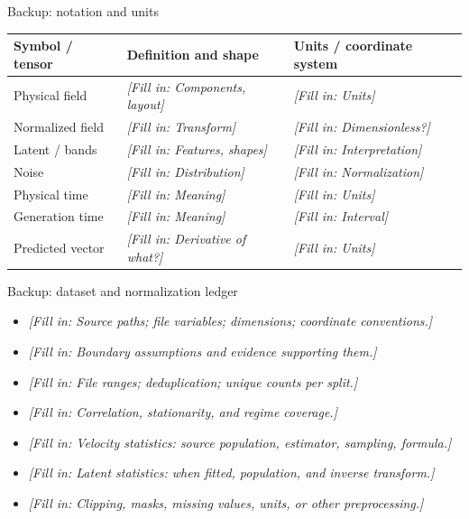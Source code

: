 \documentclass[aspectratio=169,11pt]{beamer}
\newcommand{\fillin}[1]{{\color{prompt}\textit{[Fill in: #1]}}}
\begin{document}
\appendix

\begin{frame}{Backup: notation and units}
  \small
  \begin{tabularx}{\linewidth}{lXX}
    \toprule
    Symbol / tensor & Definition and shape & Units / coordinate system \\
    \midrule
    Physical field & \fillin{Components, layout} & \fillin{Units} \\
    Normalized field & \fillin{Transform} & \fillin{Dimensionless?} \\
    Latent / bands & \fillin{Features, shapes} & \fillin{Interpretation} \\
    Noise & \fillin{Distribution} & \fillin{Normalization} \\
    Physical time & \fillin{Meaning} & \fillin{Units} \\
    Generation time & \fillin{Meaning} & \fillin{Interval} \\
    Predicted vector & \fillin{Derivative of what?} & \fillin{Units} \\
    \bottomrule
  \end{tabularx}
\end{frame}

\begin{frame}{Backup: dataset and normalization ledger}
  \begin{itemize}
    \item \fillin{Source paths; file variables; dimensions; coordinate conventions.}
    \item \fillin{Boundary assumptions and evidence supporting them.}
    \item \fillin{File ranges; deduplication; unique counts per split.}
    \item \fillin{Correlation, stationarity, and regime coverage.}
    \item \fillin{Velocity statistics: source population, estimator, sampling, formula.}
    \item \fillin{Latent statistics: when fitted, population, and inverse transform.}
    \item \fillin{Clipping, masks, missing values, units, or other preprocessing.}
  \end{itemize}
\end{frame}
\end{document}
